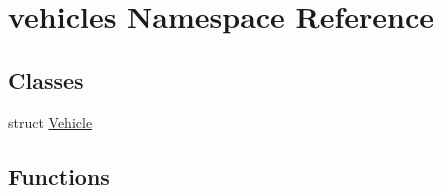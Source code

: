 \hypertarget{namespacevehicles}{}\section{vehicles Namespace Reference}
\label{namespacevehicles}
\subsection*{Classes}
\begin{DoxyCompactItemize}
\item 
struct \hyperlink{structvehicles_1_1_vehicle}{Vehicle}
\end{DoxyCompactItemize}
\subsection*{Functions}
